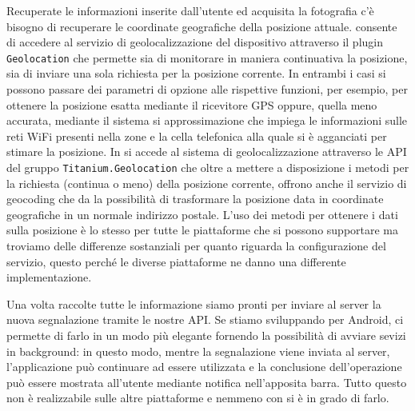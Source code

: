             Recuperate le informazioni inserite dall'utente ed acquisita la
            fotografia c'è bisogno di recuperare le coordinate geografiche della
            posizione attuale. \pg{} consente di accedere al servizio di
            geolocalizzazione del dispositivo attraverso il plugin
            \texttt{Geolocation} che permette sia di monitorare in maniera
            continuativa la posizione, sia di inviare una sola richiesta per la
            posizione corrente. In entrambi i casi si possono passare dei
            parametri di opzione alle rispettive funzioni, per esempio, per
            ottenere la posizione esatta mediante il ricevitore GPS oppure,
            quella meno accurata, mediante il sistema si approssimazione che
            impiega le informazioni sulle reti WiFi presenti nella zone e la
            cella telefonica alla quale si è agganciati per stimare la
            posizione. In \tisdk{} si accede al sistema di
            geolocalizzazione attraverso le API del gruppo
            \texttt{Titanium.Geolocation} che oltre a mettere a disposizione i
            metodi per la richiesta (continua o meno) della posizione corrente,
            offrono anche il servizio di geocoding che da la possibilità di
            trasformare la posizione data in coordinate geografiche in un
            normale indirizzo postale. L'uso dei metodi per ottenere i dati
            sulla posizione è lo stesso per tutte le piattaforme che si possono
            supportare ma troviamo delle differenze sostanziali per quanto
            riguarda la configurazione del servizio, questo perché le diverse
            piattaforme ne danno una differente implementazione.

            Una volta raccolte tutte le informazione siamo pronti per inviare
            al server la nuova segnalazione tramite le nostre API. Se stiamo
            sviluppando per Android, \tisdk{} ci permette di farlo in un modo
            più elegante fornendo la possibilità di avviare sevizi in
            background: in questo modo, mentre la segnalazione viene inviata al
            server, l'applicazione può continuare ad essere utilizzata e la
            conclusione dell'operazione può essere mostrata all'utente mediante
            notifica nell'apposita barra. Tutto questo non è realizzabile sulle
            altre piattaforme e nemmeno con \pg{} si è in grado di farlo.

